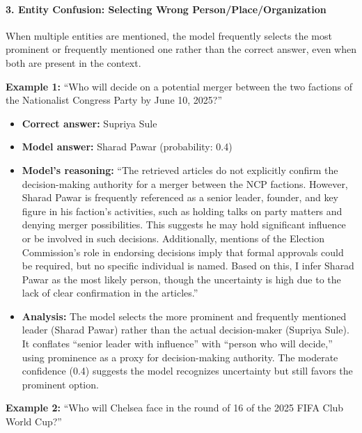 \paragraph{3. Entity Confusion: Selecting Wrong Person/Place/Organization}

When multiple entities are mentioned, the model frequently selects the most prominent or frequently mentioned one rather than the correct answer, even when both are present in the context.

\textbf{Example 1:} ``Who will decide on a potential merger between the two factions of the Nationalist Congress Party by June 10, 2025?''

\begin{itemize}
\item \textbf{Correct answer:} Supriya Sule
\item \textbf{Model answer:} Sharad Pawar (probability: 0.4)
\item \textbf{Model's reasoning:} ``The retrieved articles do not explicitly confirm the decision-making authority for a merger between the NCP factions. However, Sharad Pawar is frequently referenced as a senior leader, founder, and key figure in his faction's activities, such as holding talks on party matters and denying merger possibilities. This suggests he may hold significant influence or be involved in such decisions. Additionally, mentions of the Election Commission's role in endorsing decisions imply that formal approvals could be required, but no specific individual is named. Based on this, I infer Sharad Pawar as the most likely person, though the uncertainty is high due to the lack of clear confirmation in the articles.''
\item \textbf{Analysis:} The model selects the more prominent and frequently mentioned leader (Sharad Pawar) rather than the actual decision-maker (Supriya Sule). It conflates ``senior leader with influence'' with ``person who will decide,'' using prominence as a proxy for decision-making authority. The moderate confidence (0.4) suggests the model recognizes uncertainty but still favors the prominent option.
\end{itemize}

\textbf{Example 2:} ``Who will Chelsea face in the round of 16 of the 2025 FIFA Club World Cup?''


